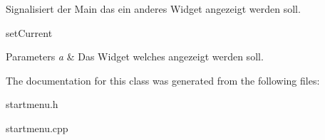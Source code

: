 Signalisiert der Main das ein anderes Widget angezeigt werden soll. 

set\+Current 
\begin{DoxyParams}{Parameters}
{\em a} & Das Widget welches angezeigt werden soll. \\
\hline
\end{DoxyParams}


The documentation for this class was generated from the following files\+:\begin{DoxyCompactItemize}
\item 
startmenu.\+h\item 
startmenu.\+cpp\end{DoxyCompactItemize}
